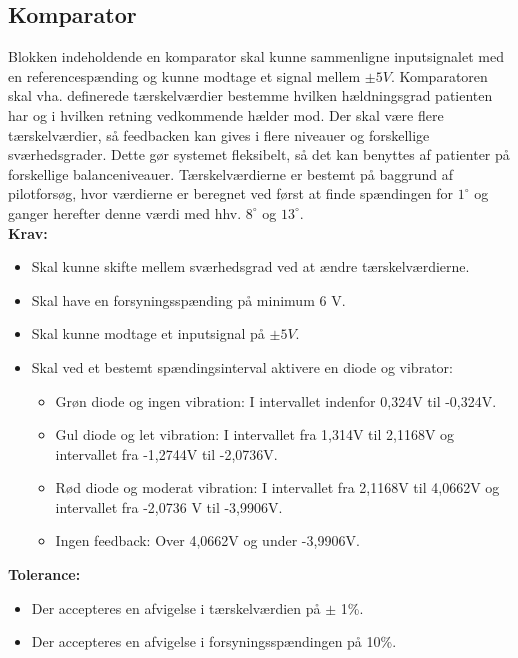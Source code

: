 \subsection{Komparator}\label{KomparatorAfs} 
Blokken indeholdende en komparator skal kunne sammenligne inputsignalet med en referencespænding og kunne modtage et signal mellem $\pm 5 V$. Komparatoren skal vha. definerede tærskelværdier bestemme hvilken hældningsgrad patienten har og i hvilken retning vedkommende hælder mod. Der skal være flere tærskelværdier, så feedbacken kan gives i flere niveauer og forskellige sværhedsgrader. Dette gør systemet fleksibelt, så det kan benyttes af patienter på forskellige balanceniveauer. Tærskelværdierne er bestemt på baggrund af pilotforsøg, hvor værdierne er beregnet ved først at finde spændingen for $1^{\circ}$ og ganger herefter denne værdi med hhv. $8^{\circ}$ og $13^{\circ}$.\\
\textbf{Krav:} 
\begin{itemize}
	\item Skal kunne skifte mellem sværhedsgrad ved at ændre tærskelværdierne.
	\item Skal have en forsyningsspænding på minimum 6 V.
	\item Skal kunne modtage et inputsignal på $\pm 5 V$. 
	\item Skal ved et bestemt spændingsinterval aktivere en diode og vibrator:
	\begin{itemize}
		\item Grøn diode og ingen vibration: I intervallet indenfor 0,324V til -0,324V.
		\item Gul diode og let vibration: I intervallet fra 1,314V til 2,1168V og intervallet fra -1,2744V til -2,0736V.
		\item Rød diode og moderat vibration: I intervallet fra 2,1168V til 4,0662V og intervallet fra -2,0736 V til -3,9906V.
		\item Ingen feedback: Over 4,0662V og under -3,9906V. 
	\end{itemize}
\end{itemize}
\textbf{Tolerance:}
\begin{itemize}
	\item Der accepteres en afvigelse i tærskelværdien på $\pm$ 1\%.
	\item Der accepteres en afvigelse i forsyningsspændingen på 10\%.
\end{itemize}

